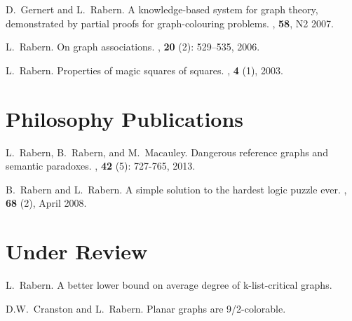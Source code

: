 \documentclass[margin,line]{res}
\begin{document}
\begin{resume}
\begin{enumerate}[{[}1{]}]
\smallskip

\item
D.~Gernert and L.~Rabern.
\newblock A knowledge-based system for graph theory, demonstrated by partial proofs for graph-colouring problems.
, \textbf{58}, N2 2007.

\smallskip

\item L.~Rabern.
\newblock On graph associations.
, \textbf{20}  (2): 529--535,
  2006.

\smallskip

\item L.~Rabern.
\newblock Properties of magic squares of squares.
, \textbf{4}
  (1), 2003. 

\end{enumerate}

\section{\sc Philosophy Publications}
\begin{enumerate}[{[}1{]}]
	\setcounter{enumi}{29}
\item
L.~Rabern, B.~Rabern, and M.~Macauley.
\newblock Dangerous reference graphs and semantic paradoxes.
, \textbf{42} (5): 727-765, 2013.

\smallskip

\item
B.~Rabern and L.~Rabern.
\newblock A simple solution to the hardest logic puzzle ever. 
, \textbf{68} (2), April 2008.

\end{enumerate}
\section{\sc Under Review}

\begin{enumerate}[{[}1{]}]
\setcounter{enumi}{31}


\item
L.~Rabern.
\newblock A better lower bound on average degree of k-list-critical graphs.

\smallskip

\item
D.W.~Cranston and L.~Rabern.
\newblock Planar graphs are 9/2-colorable.


\end{enumerate}
\end{resume}
\end{document}
